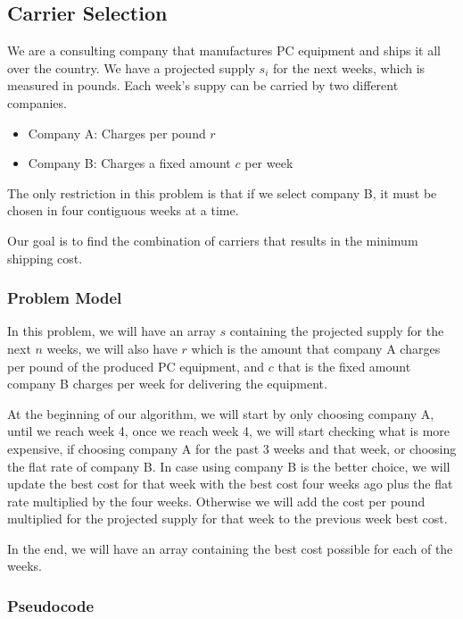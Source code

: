 \documentclass{article}
\begin{document}

\subsection*{Carrier Selection}

We are a consulting company that manufactures PC equipment and ships it all over the country. We have a projected supply $s_i$ for the next weeks, which is measured in pounds. Each week's suppy can be carried by two different companies.

\begin{itemize}
 \item Company A: Charges per pound $r$
 \item Company B: Charges a fixed amount $c$ per week
\end{itemize}

The only restriction in this problem is that if we select company B, it must be chosen in four contiguous weeks at a time.

Our goal is to find the combination of carriers that results in the minimum shipping cost.

\subsubsection*{Problem Model}

In this problem, we will have an array $s$ containing the projected supply for the next $n$ weeks, we will also have $r$ which is the amount that company A charges per pound of the produced PC equipment, and $c$ that is the fixed amount company B charges per week for delivering the equipment.

At the beginning of our algorithm, we will start by only choosing company A, until we reach week 4, once we reach week 4, we will start checking  what is more expensive, if choosing company A for the past 3 weeks and that week, or choosing the flat rate of company B. In case using company B is the better choice, we will update the best cost for that week with the best cost four weeks ago plus the flat rate multiplied by the four weeks. Otherwise we will add the cost per pound multiplied for the projected supply for that week to the previous week best cost.

In the end, we will have an array containing the best cost possible for each of the weeks.

\subsubsection*{Pseudocode}
\end{document}
